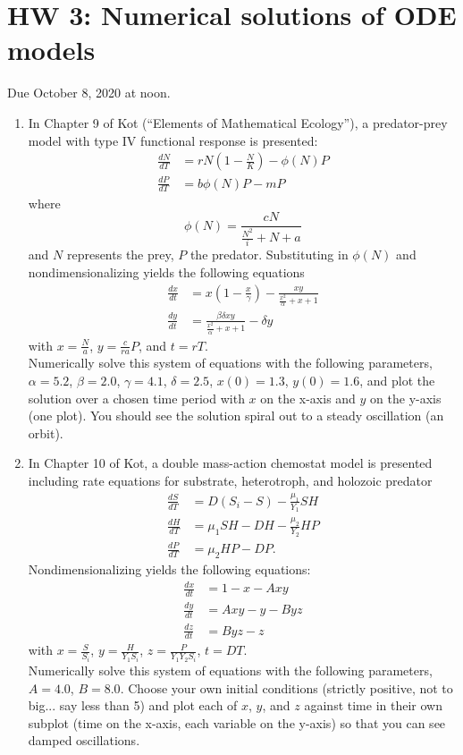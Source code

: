 \documentclass[11pt]{article}
\begin{document}
\section*{HW 3: Numerical solutions of ODE models}
Due October 8, 2020 at noon.

\begin{enumerate}
	\item In Chapter 9 of Kot (``Elements of Mathematical Ecology''), a predator-prey model with type IV functional response is presented:
	\begin{align*}
		\frac{dN}{dT} &= rN\left(1-\frac{N}{K}\right) - \phi(N)P\\
		\frac{dP}{dT} &= b\phi(N)P-mP
	\end{align*}
	where
	\[
	\phi(N) = \frac{cN}{\frac{N^2}{i}+N+a}
	\]
	and $N$ represents the prey, $P$ the predator. Substituting in $\phi(N)$ and nondimensionalizing yields the following equations
	\begin{align*}
		\frac{dx}{dt} &= x\left(1-\frac{x}{\gamma}\right) - \frac{xy}{\frac{x^2}{\alpha}+x+1}\\
		\frac{dy}{dt} &= \frac{\beta\delta xy}{\frac{x^2}{\alpha}+x+1} - \delta y
	\end{align*}
	with $x=\frac{N}{a}$, $y=\frac{c}{ra}P$, and $t=rT$.\\
	Numerically solve this system of equations with the following parameters,\\
	$\alpha=5.2$, $\beta=2.0$, $\gamma=4.1$, $\delta=2.5$, $x(0)=1.3$, $y(0)=1.6$,
	and plot the solution over a chosen time period with $x$ on the x-axis and $y$ on the y-axis (one plot). You should see the solution spiral out to a steady oscillation (an orbit).
	
	\item In Chapter 10 of Kot, a double mass-action chemostat model is presented including rate equations for substrate, heterotroph, and holozoic predator
	\begin{align*}
		\frac{dS}{dT} &= D(S_i-S) - \frac{\mu_1}{Y_1}SH\\
		\frac{dH}{dT} &= \mu_1SH - DH - \frac{\mu_2}{Y_2}HP\\
		\frac{dP}{dT} &= \mu_2HP - DP.
	\end{align*}
	Nondimensionalizing yields the following equations:
	\begin{align*}
		\frac{dx}{dt} &= 1-x-Axy\\
		\frac{dy}{dt} &= Axy-y-Byz\\
		\frac{dz}{dt} &= Byz-z
	\end{align*}
	with $x=\frac{S}{S_i}$, $y=\frac{H}{Y_1S_i}$, $z=\frac{P}{Y_1Y_2S_i}$, $t=DT$.\\
	Numerically solve this system of equations with the following parameters,\\
	$A=4.0$, $B=8.0$. Choose your own initial conditions (strictly positive, not to big... say less than 5) and plot each of $x$, $y$, and $z$ against time in their own subplot (time on the x-axis, each variable on the y-axis) so that you can see damped oscillations.
\end{enumerate}
\end{document}
